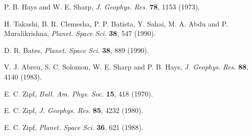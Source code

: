 \documentclass{ws-rv9x6}
\begin{document}
\begin{thebibliography}{000}
P. B. Hays and W. E. Sharp, {\it J. Geophys. Res.} {\bf 78}, 1153
(1973).

H. Takashi, B. R. Clemesha, P. P. Batista, Y.  Sahai, M. A. Abdu
and P. Muralikrishna, {\it Planet. Space Sci.} {\bf 38}, 547 (1990).

D. R. Bates, {\it Planet. Space Sci.} {\bf 38}, 889 (1990).

V. J. Abreu, S. C. Solomon, W. E. Sharp and P. B. Hays, {\it
J. Geophys. Res.} {\bf 88}, 4140 (1983).

E. C. Zipf, {\it Bull. Am. Phys. Soc.} {\bf 15}, 418 (1970).

E. C. Zipf, {\it J. Geophys. Res.} {\bf 85}, 4232 (1980).

E. C. Zipf, {\it Planet. Space Sci.} {\bf 36}, 621 (1988).
\end{thebibliography}
\end{document}
